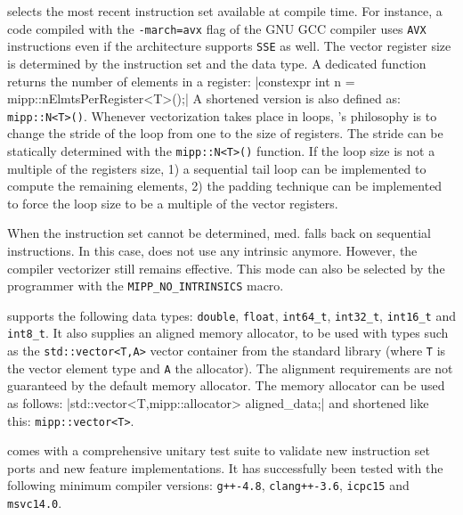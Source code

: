 \MIPP selects the most recent instruction set available at compile time. For
instance, a code compiled with the \verb|-march=avx| flag of the GNU GCC
compiler uses \verb|AVX| instructions even if the architecture supports
\verb|SSE| as well. The vector register size is determined by the instruction
set and the data type. A dedicated function returns the number of elements in a
\MIPP register:
|constexpr int n = mipp::nElmtsPerRegister<T>();|
A shortened version is also defined as: \verb|mipp::N<T>()|. Whenever
vectorization takes place in loops, \MIPP's philosophy is to change the stride
of the loop from one to the size of registers. The stride can be statically
determined with the \verb|mipp::N<T>()| function.
If the loop size is not a multiple of the registers size, 1) a sequential tail
loop can be implemented to compute the remaining elements, 2) the padding
technique can be implemented to force the loop size to be a multiple of the
vector registers.

When the instruction set cannot be determined, \MIPP med. falls back on
sequential instructions. In this case, \MIPP does not use any intrinsic anymore.
However, the compiler vectorizer still remains effective. This mode can also be
selected by the programmer with the \verb|MIPP_NO_INTRINSICS| macro.

\MIPP supports the following data types: \verb|double|, \verb|float|,
\verb|int64_t|, \verb|int32_t|, \verb|int16_t| and \verb|int8_t|. It also
supplies an aligned memory allocator, to be used with types such as the
\verb|std::vector<T,A>| vector container from the \Cxx standard library (where
\verb|T| is the vector element type and \verb|A| the allocator). The alignment
requirements are not guaranteed by the default \Cxx memory allocator. The \MIPP
memory allocator can be used as follows:
|std::vector<T,mipp::allocator> aligned_data;|
and shortened like this: \verb|mipp::vector<T>|.

\MIPP comes with a comprehensive unitary test suite to validate new instruction
set ports and new feature implementations. It has successfully been tested with
the following minimum compiler versions: \verb|g++-4.8|, \verb|clang++-3.6|,
\verb|icpc15| and \verb|msvc14.0|.

